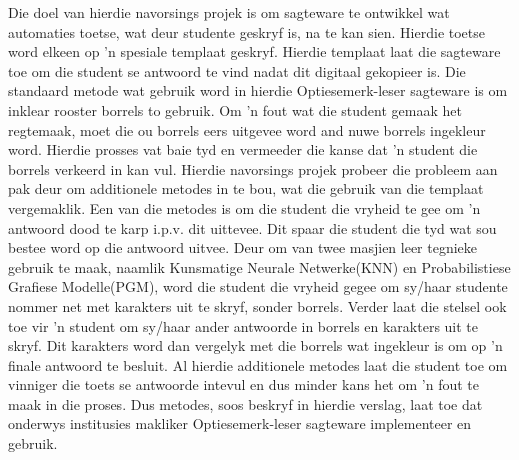 
\begin{uittreksel}    %
Die doel van hierdie navorsings projek is om sagteware te ontwikkel wat automaties toetse, wat deur studente geskryf is, na te kan sien. Hierdie toetse word elkeen op 'n spesiale templaat geskryf. Hierdie templaat laat die sagteware toe om die student se antwoord te vind nadat dit digitaal gekopieer is. Die standaard metode wat gebruik word in hierdie Optiesemerk-leser sagteware is om inklear rooster borrels to gebruik. Om 'n fout wat die student gemaak het regtemaak, moet die ou borrels eers uitgevee word and nuwe borrels ingekleur word. Hierdie prosses vat baie tyd en vermeeder die kanse dat 'n student die borrels verkeerd in kan vul. Hierdie navorsings projek probeer die probleem aan pak deur om additionele metodes in te bou, wat die gebruik van die templaat vergemaklik. Een van die metodes is om die student die vryheid te gee om 'n antwoord dood te karp i.p.v. dit uittevee. Dit spaar die student die tyd wat sou bestee word op die antwoord uitvee. Deur om van twee masjien leer tegnieke gebruik te maak, naamlik Kunsmatige Neurale Netwerke(KNN) en Probabilistiese Grafiese Modelle(PGM), word die student die vryheid gegee om sy/haar studente nommer net met karakters uit te skryf, sonder borrels. Verder laat die stelsel ook toe vir 'n student om sy/haar ander antwoorde in borrels en karakters uit te skryf. Dit karakters word dan vergelyk met die borrels wat ingekleur is om op 'n finale antwoord te besluit. Al hierdie additionele metodes laat die student toe om vinniger die toets se antwoorde intevul en dus minder kans het om 'n fout te maak in die proses. Dus metodes, soos beskryf in hierdie verslag, laat toe dat onderwys institusies makliker Optiesemerk-leser sagteware implementeer en gebruik. 
\end{uittreksel}
